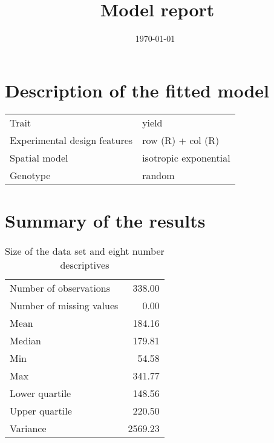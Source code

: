 \documentclass[a4paper,11pt]{article}\usepackage[]{graphicx}\usepackage[]{color}
\title{Model report}%
\author{\vspace{-5ex}}
\date{\today\ \currenttime} %
\begin{document}



\maketitle

\singlespacing

\section{Description of the fitted model}

\begin{table}[ht]
\begin{flushleft}
\begin{tabular}{ll}
  Trait & yield \\ 
  Experimental design features & row (R) + col (R) \\ 
  Spatial model & isotropic exponential \\ 
  Genotype & random \\ 
  \end{tabular}
\label{modelDescription}
\end{flushleft}
\end{table}


\section{Summary of the results}

\begin{table}[ht]
\begin{flushleft}
\caption{Size of the data set and eight number descriptives} 
\label{modelSummary}
\begin{tabular}{lr}
  \hline
  \hline
Number of observations & 338.00 \\ 
  Number of missing values & 0.00 \\ 
  Mean & 184.16 \\ 
  Median & 179.81 \\ 
  Min & 54.58 \\ 
  Max & 341.77 \\ 
  Lower quartile & 148.56 \\ 
  Upper quartile & 220.50 \\ 
  Variance & 2569.23 \\ 
   \hline
\end{tabular}
\end{flushleft}
\end{table}
\end{document}
